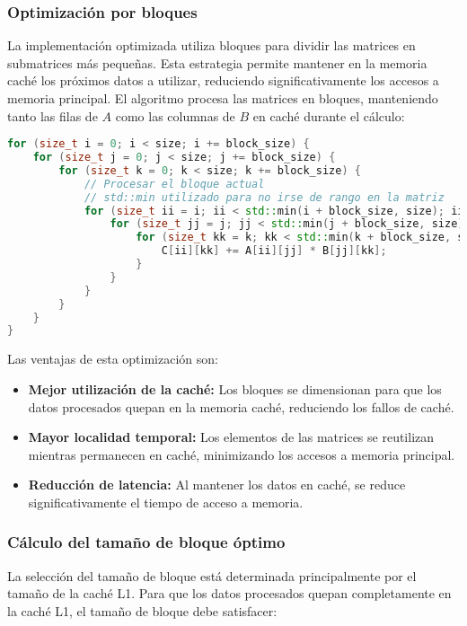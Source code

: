 \documentclass{article}
\begin{document}
\subsubsection{Optimización por bloques}
La implementación optimizada utiliza bloques para dividir las matrices en submatrices más pequeñas. Esta estrategia permite mantener en la memoria caché los próximos datos a utilizar, reduciendo significativamente los accesos a memoria principal. El algoritmo procesa las matrices en bloques, manteniendo tanto las filas de $A$ como las columnas de $B$ en caché durante el cálculo:


\begin{lstlisting}[style=cpp,language=C++]
for (size_t i = 0; i < size; i += block_size) {
    for (size_t j = 0; j < size; j += block_size) {
        for (size_t k = 0; k < size; k += block_size) {
            // Procesar el bloque actual
            // std::min utilizado para no irse de rango en la matriz
            for (size_t ii = i; ii < std::min(i + block_size, size); ii++) {
                for (size_t jj = j; jj < std::min(j + block_size, size); jj++) {
                    for (size_t kk = k; kk < std::min(k + block_size, size); kk++) {
                        C[ii][kk] += A[ii][jj] * B[jj][kk];
                    }
                }
            }
        }
    }
}
\end{lstlisting}

Las ventajas de esta optimización son:
\begin{itemize}[noitemsep]
    \item \textbf{Mejor utilización de la caché:} Los bloques se dimensionan para que los datos procesados quepan en la memoria caché, reduciendo los fallos de caché.
    \item \textbf{Mayor localidad temporal:} Los elementos de las matrices se reutilizan mientras permanecen en caché, minimizando los accesos a memoria principal.
    \item \textbf{Reducción de latencia:} Al mantener los datos en caché, se reduce significativamente el tiempo de acceso a memoria.
\end{itemize}

\subsubsection{Cálculo del tamaño de bloque óptimo}
La selección del tamaño de bloque está determinada principalmente por el tamaño de la caché L1. Para que los datos procesados quepan completamente en la caché L1, el tamaño de bloque debe satisfacer:
\end{document}
